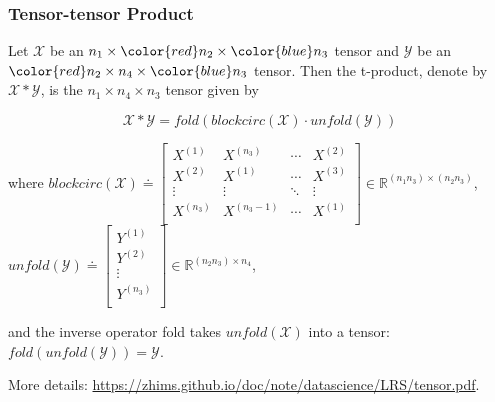 \documentclass[aspectratio=2516]{beamer}
\begin{document}
\begin{frame}
\frametitle{\small Tensor-tensor Product}
\begin{definition}
	\small
	Let $ \mathcal{X} $ be an $ n_{1} \times {\color{red} n_{2}} \times {\color{blue} n_{3}} $ tensor and $ \mathcal{Y} $ be an $ {\color{red} n_{2}}  \times n_{4}\times {\color{blue} n_{3}} $ tensor. Then the t-product, denote by $ \mathcal{X}  * \mathcal{Y} $, is the $ n_{1} \times n_{4} \times n_{3} $ tensor given by
	
	\begin{equation}
	\mathcal{X} * \mathcal{Y} = fold(blockcirc (\mathcal{X}) \cdot unfold (\mathcal{Y}))
	\label{eq1}
	\end{equation}
	
	where {\tiny $blockcirc(\mathcal{X})  \doteq \left[ {\begin{matrix}
			{{X^{\left( 1 \right)}}} 		& {{X^{\left( n_3 \right)}}} 				&  \cdots  & {{X^{\left( 2 \right)}}}  \\ 
			{{X^{\left( 2 \right)}}} 		& {{X^{\left( 1 \right)}}} 				&  \cdots  & {{X^{\left( 3 \right)}}}  \\ 
			\vdots   		&  \vdots 				    			&  \ddots  &  \vdots  					 \\ 
			{{X^{\left( {{n_3}} \right)}}}  & {{X^{\left( {{n_3} - 1} \right)}}}    &  \cdots  & {{X^{\left( 1 \right)}}}  \\ 
			
			\end{matrix} } \right] \in {\mathbb{R}^{\left( {{n_1}{n_3}} \right) \times \left( {{n_2}{n_3}} \right)}}$, $unfold(\mathcal{Y})  \doteq \left[ {\begin{matrix}
			{{Y^{\left( 1 \right)}}}  \\ 
			{{Y^{\left( 2 \right)}}}  \\ 
			\vdots   \\ 
			{{Y^{\left( {{n_3}} \right)}}}  \\ 
			
			\end{matrix} } \right] \in {\mathbb{R}^{\left( {{n_2}{n_3}} \right) \times {n_4}}}$,}  \\
	
	\vspace{0.25cm}
	
	and the inverse operator fold takes $ unfold(\mathcal{X}) $ into a tensor: $ fold(unfold(\mathcal{Y})) = \mathcal{Y} $.
	\label{def1}
\end{definition}

\vspace{0.5cm}

{\tiny More details:} {\color{blue} \tiny \url{https://zhims.github.io/doc/note/datascience/LRS/tensor.pdf}}.

\end{frame}
\end{document}
